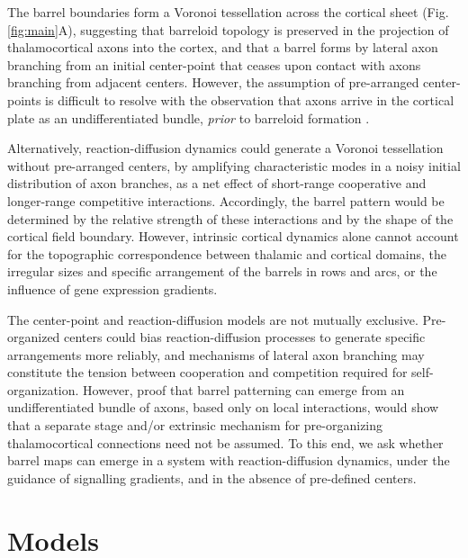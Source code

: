 \documentclass[9pt,lineno]{elife}
\begin{document}
The barrel boundaries form a Voronoi tessellation across the cortical sheet
\citep{senft_mouse_1991} (Fig.\,\ref{fig:main}A), suggesting that barreloid topology is
preserved in the projection of thalamocortical axons into the cortex, and that
a barrel forms by lateral axon branching from an initial center-point that
ceases upon contact with axons branching from adjacent centers.  However, the
assumption of pre-arranged center-points is difficult to resolve with the
observation that axons arrive in the cortical plate as an undifferentiated
bundle, \emph{prior} to barreloid formation \citep{agmon_organized_1993}.


Alternatively, reaction-diffusion dynamics could generate a Voronoi
tessellation without pre-arranged centers, by amplifying characteristic modes
in a noisy initial distribution of axon branches, as a net effect of
short-range cooperative and longer-range competitive
interactions. Accordingly, the barrel pattern would be determined by the
relative strength of these interactions and by the shape of the cortical field
boundary. However, intrinsic cortical dynamics alone cannot account for the
topographic correspondence between thalamic and cortical domains, the
irregular sizes and specific arrangement of the barrels in rows and arcs, or
the influence of gene expression gradients.

The center-point and reaction-diffusion models are not mutually
exclusive. Pre-organized centers could bias reaction-diffusion processes to
generate specific arrangements more reliably, and mechanisms of lateral axon
branching may constitute the tension between cooperation and competition
required for self-organization. However, proof that barrel patterning can
emerge from an undifferentiated bundle of axons, based only on local
interactions, would show that a separate stage and/or extrinsic mechanism for
pre-organizing thalamocortical connections need not be assumed. To this end,
we ask whether barrel maps can emerge in a system with reaction-diffusion
dynamics, under the guidance of signalling gradients, and in the absence of
pre-defined centers.


\section{Models}
\end{document}
